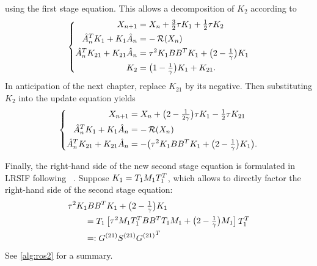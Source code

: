 using the first stage equation.
This allows a decomposition of $K_2$ according to
\begin{equation}
\left\{
\begin{aligned}
  X_{n+1} &= X_n + \tfrac{3}{2} \tau K_1 + \tfrac{1}{2} \tau K_2 \\
  \hat A_n^T K_1 + K_1 \hat A_n &= -\operatorname{\mathcal R}(X_n) \\
  \hat A_n^T K_{21} + K_{21} \hat A_n &= \tau^2 K_1 BB^T K_1 + \big( 2-\tfrac{1}{\gamma} \big) K_1 \\
  K_2 &= \big( 1-\tfrac{1}{\gamma} \big) K_1 + K_{21}
  .
\end{aligned}
\right.
\end{equation}
In anticipation of the next chapter, replace $K_{21}$ by its negative.
Then substituting $K_2$ into the update equation yields
\begin{equation}
\left\{
\begin{aligned}
  X_{n+1} &= X_n + \big( 2 - \tfrac{1}{2\gamma} \big) \tau K_1 - \tfrac{1}{2} \tau K_{21} \\
  \hat A_n^T K_1 + K_1 \hat A_n &= -\operatorname{\mathcal R}(X_n) \\
  \hat A_n^T K_{21} + K_{21} \hat A_n &= -\big( \tau^2 K_1 BB^T K_1 + \big( 2-\tfrac{1}{\gamma} \big) K_1 \big)
  .
\end{aligned}
\right.
\end{equation}

\pagebreak

Finally, the right-hand side of the new second stage equation
is formulated in \ac{LRSIF} following \citeauthor{Lang2015}~\cite{Lang2015}.
Suppose $K_1 = T_1 M_1 T_1^T$,
which allows to directly factor the right-hand side of the second stage equation:
\begin{subequations}
\begin{align}
  \MoveEqLeft
  \tau^2 K_1 BB^\T K_1 + \big( 2-\tfrac{1}{\gamma} \big) K_1
  \nonumber \\
  &= T_1 \begin{bmatrix}
    \tau^2 M_1 T_1^\T BB^\T T_1 M_1 + \big( 2-\tfrac{1}{\gamma} \big) M_1
  \end{bmatrix}
  T_1^\T
  \\
  &=: G^{(21)} S^{(21)} {G^{(21)}}^\T
\end{align}
\end{subequations}
See \autoref{alg:ros2} for a summary.

